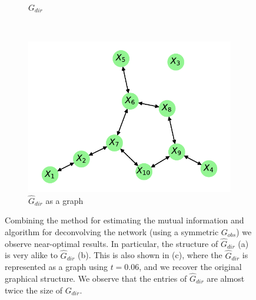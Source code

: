 \documentclass[../Thesis.tex]{subfiles}
\begin{document}
\begin{figure}[H]
\begin{subfigure}[t]{0.49\linewidth}
        \caption{$G_{dir}$}
    \end{subfigure}
    \\[\baselineskip]
    \begin{subfigure}[t]{0.49\linewidth}
        \includegraphics[width = \linewidth]{figures/ND examples/Gaussian network 10 - G_dir as graph - symmetric.pdf}
        \caption{$\hat{G}_{dir}$ as a graph}
    \end{subfigure}
    \caption{Combining the method for estimating the mutual information and algorithm for deconvolving the network (using a symmetric $G_{obs}$) we observe near-optimal results. In particular, the structure of $\hat{G}_{dir}$ (a) is very alike to $\hat{G}_{dir}$ (b). This is also shown in (c), where the $\hat{G}_{dir}$ is represented as a graph using $t = 0.06$, and we recover the original graphical structure. We observe that the entries of $\hat{G}_{dir}$ are almost twice the size of $G_{dir}$.}
    \label{fig:estimated MI 10 Gaussian results}
\end{figure}
\end{document}
